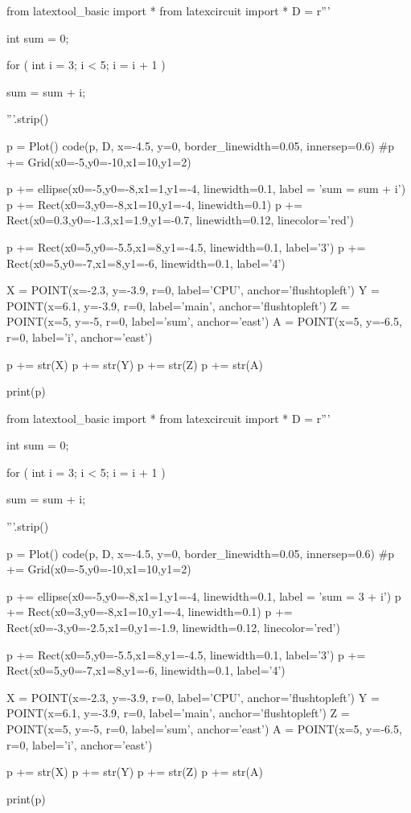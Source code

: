 \begin{python}
from latextool_basic import *
from latexcircuit import *
D = r'''



int sum = 0;

    for ( int i = 3;     i < 5;     i = i + 1 )


        sum = sum + i;



'''.strip()

p = Plot()
code(p, D, x=-4.5, y=0, border_linewidth=0.05, innersep=0.6)
#p += Grid(x0=-5,y0=-10,x1=10,y1=2)

p += ellipse(x0=-5,y0=-8,x1=1,y1=-4, linewidth=0.1, label = 'sum = sum + i')
p += Rect(x0=3,y0=-8,x1=10,y1=-4, linewidth=0.1)
p += Rect(x0=0.3,y0=-1.3,x1=1.9,y1=-0.7, linewidth=0.12, linecolor='red')

p += Rect(x0=5,y0=-5.5,x1=8,y1=-4.5, linewidth=0.1, label='3')
p += Rect(x0=5,y0=-7,x1=8,y1=-6, linewidth=0.1, label='4')

X = POINT(x=-2.3, y=-3.9, r=0, label='CPU', anchor='flushtopleft')
Y = POINT(x=6.1, y=-3.9, r=0, label='main', anchor='flushtopleft')
Z = POINT(x=5, y=-5, r=0, label='sum', anchor='east')
A = POINT(x=5, y=-6.5, r=0, label='i', anchor='east')

p += str(X)
p += str(Y)
p += str(Z)
p += str(A)

print(p)
\end{python}

\begin{python}
from latextool_basic import *
from latexcircuit import *
D = r'''



int sum = 0;

    for ( int i = 3;     i < 5;     i = i + 1 )


        sum = sum + i;



'''.strip()

p = Plot()
code(p, D, x=-4.5, y=0, border_linewidth=0.05, innersep=0.6)
#p += Grid(x0=-5,y0=-10,x1=10,y1=2)

p += ellipse(x0=-5,y0=-8,x1=1,y1=-4, linewidth=0.1, label = 'sum = 3 + i')
p += Rect(x0=3,y0=-8,x1=10,y1=-4, linewidth=0.1)
p += Rect(x0=-3,y0=-2.5,x1=0,y1=-1.9, linewidth=0.12, linecolor='red')

p += Rect(x0=5,y0=-5.5,x1=8,y1=-4.5, linewidth=0.1, label='3')
p += Rect(x0=5,y0=-7,x1=8,y1=-6, linewidth=0.1, label='4')

X = POINT(x=-2.3, y=-3.9, r=0, label='CPU', anchor='flushtopleft')
Y = POINT(x=6.1, y=-3.9, r=0, label='main', anchor='flushtopleft')
Z = POINT(x=5, y=-5, r=0, label='sum', anchor='east')
A = POINT(x=5, y=-6.5, r=0, label='i', anchor='east')

p += str(X)
p += str(Y)
p += str(Z)
p += str(A)

print(p)
\end{python}

